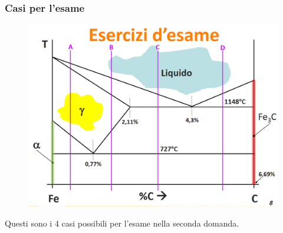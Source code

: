 \documentclass{article}
\begin{document}
{            \subsubsection{Casi per l'esame}
                \begin{figure}[h!]
                    \centering
                    \includegraphics[width=.85\linewidth]{L12 - Diagramma Fe-C Casi di Esercizi per L'Esame.png}
                \end{figure}
                Questi sono i 4 casi possibili per l'esame nella seconda domanda.
}
\end{document}
